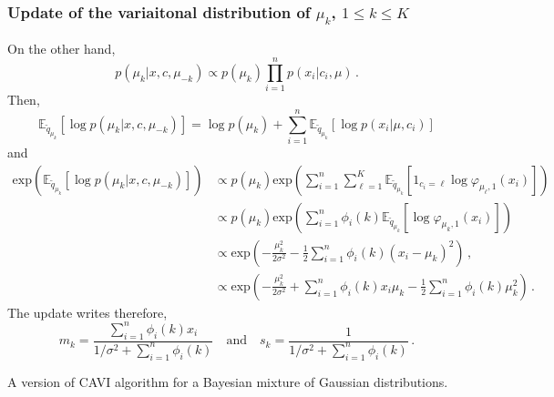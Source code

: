 \documentclass[english,graybox,envcountchap,envcountsame,sectrefs,shortlabels]{svmono}
\theoremstyle{style}
\begin{document}
\subsubsection*{Update of the variaitonal distribution of $\mu_k$, $1\leq k \leq K$}
On the other hand,
$$
p(\mu_k|x,c,\mu_{-k}) \propto p(\mu_k)\prod_{i=1}^np(x_i|c_i,\mu) \,. 
$$
Then,
$$
\mathbb{E}_{\tilde q_{\mu_k}}[\log p(\mu_k|x,c,\mu_{-k})] = \log p(\mu_k) + \sum_{i=1}^n \mathbb{E}_{\tilde q_{\mu_k}}[\log p(x_i|\mu,c_i)]
$$
and
\begin{align*}
\mathrm{exp}\left(\mathbb{E}_{\tilde q_{\mu_k}}[\log p(\mu_k|x,c,\mu_{-k})]\right) &\propto p(\mu_k) \mathrm{exp}\left(\sum_{i=1}^n\sum_{\ell=1}^K  \mathbb{E}_{\tilde q_{\mu_k}}[1_{c_i=\ell}\log \varphi_{\mu_\ell,1}(x_i)]\right)\,\\
&\propto p(\mu_k) \mathrm{exp}\left(\sum_{i=1}^n \phi_i(k) \mathbb{E}_{\tilde q_{\mu_k}}[\log \varphi_{\mu_k,1}(x_i)]\right)\,\\
&\propto \mathrm{exp}\left(-\frac{\mu_k^2}{2\sigma^2}-\frac{1}{2}\sum_{i=1}^n \phi_i(k)(x_i-\mu_k)^2\right)\,,\\
&\propto \mathrm{exp}\left(-\frac{\mu_k^2}{2\sigma^2}+\sum_{i=1}^n \phi_i(k)x_i\mu_k - \frac{1}{2}\sum_{i=1}^n \phi_i(k)\mu^2_k\right)\,.
\end{align*}
The update writes therefore,
$$
m_k = \frac{\sum_{i=1}^n \phi_i(k)x_i}{1/\sigma^2 + \sum_{i=1}^n \phi_i(k)}\quad\mathrm{and}\quad s_k = \frac{1}{1/\sigma^2 + \sum_{i=1}^n \phi_i(k)}\,. 
$$

\begin{algorithm}[H] \label{alg:CAVI:mixtureGauss}
\caption{A version of CAVI algorithm for a Bayesian mixture of Gaussian distributions.}
\end{algorithm}
\end{document}
